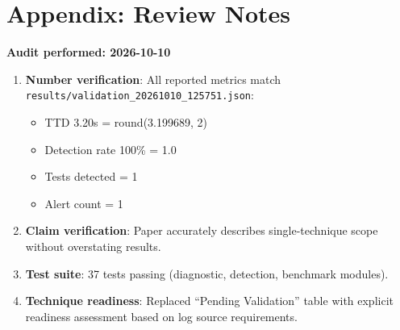 \documentclass[11pt,a4paper]{article}
\begin{document}
\section*{Appendix: Review Notes}

\textbf{Audit performed: 2026-10-10}

\begin{enumerate}
    \item \textbf{Number verification}: All reported metrics match \texttt{results/validation\_20261010\_125751.json}:
    \begin{itemize}
        \item TTD 3.20s = round(3.199689, 2) \checkmark
        \item Detection rate 100\% = 1.0 \checkmark
        \item Tests detected = 1 \checkmark
        \item Alert count = 1 \checkmark
    \end{itemize}

    \item \textbf{Claim verification}: Paper accurately describes single-technique scope without overstating results.

    \item \textbf{Test suite}: 37 tests passing (diagnostic, detection, benchmark modules).

    \item \textbf{Technique readiness}: Replaced ``Pending Validation'' table with explicit readiness assessment based on log source requirements.
\end{enumerate}
\end{document}
